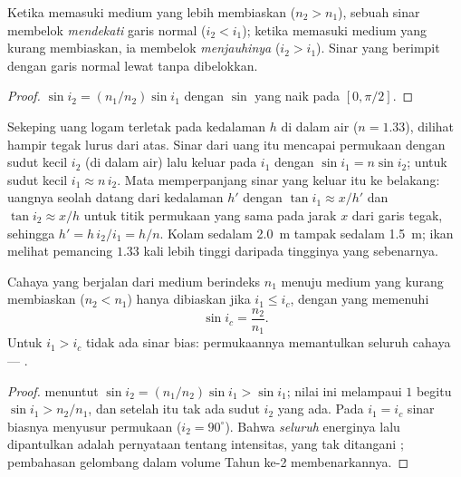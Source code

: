 \begin{proposition}\label{prop:b1:rays-reflection-refraction:bending}
Ketika memasuki medium yang lebih membiaskan ($n_2 > n_1$), sebuah sinar
membelok \emph{mendekati} garis normal ($i_2 < i_1$); ketika memasuki
medium yang kurang membiaskan, ia membelok \emph{menjauhinya}
($i_2 > i_1$). Sinar yang berimpit dengan garis normal lewat tanpa
dibelokkan.
\end{proposition}

\begin{proof}
$\sin i_2 = (n_1/n_2)\sin i_1$ dengan $\sin$ yang naik pada
$[0, \pi/2]$.
\end{proof}

\begin{example}\label{ex:b1:rays-reflection-refraction:depth}
Sekeping uang logam terletak pada kedalaman $h$ di dalam air
($n = 1.33$), dilihat hampir tegak lurus dari atas. Sinar dari uang itu
mencapai permukaan dengan sudut kecil $i_2$ (di dalam air) lalu keluar
pada $i_1$ dengan $\sin i_1 = n\sin i_2$; untuk sudut kecil
$i_1 \approx n\,i_2$. Mata memperpanjang sinar yang keluar itu ke
belakang: uangnya seolah datang dari kedalaman $h'$ dengan
$\tan i_1 \approx x/h'$ dan $\tan i_2 \approx x/h$ untuk titik permukaan
yang sama pada jarak $x$ dari garis tegak, sehingga
$h' = h\,i_2/i_1 = h/n$. Kolam sedalam \qty{2.0}{m} tampak sedalam
\qty{1.5}{m}; ikan melihat pemancing $1.33$ kali lebih tinggi daripada
tingginya yang sebenarnya.
\end{example}

\begin{theorem}\label{thm:b1:rays-reflection-refraction:tir}
Cahaya yang berjalan dari medium berindeks $n_1$ menuju medium yang
kurang membiaskan ($n_2 < n_1$) hanya dibiaskan jika $i_1 \leq i_c$,
dengan \emph{} yang memenuhi
\[
\sin i_c = \frac{n_2}{n_1} .
\]
Untuk $i_1 > i_c$ tidak ada sinar bias: permukaannya memantulkan seluruh
cahaya --- \emph{}.
\end{theorem}

\begin{proof}
 menuntut $\sin i_2 = (n_1/n_2)\sin i_1 > \sin i_1$; nilai ini
melampaui $1$ begitu $\sin i_1 > n_2/n_1$, dan setelah itu tak ada sudut
$i_2$ yang ada. Pada $i_1 = i_c$ sinar biasnya menyusur permukaan
($i_2 = 90^\circ$). Bahwa \emph{seluruh} energinya lalu dipantulkan
adalah pernyataan tentang intensitas, yang tak ditangani ; pembahasan gelombang dalam volume Tahun ke-2 membenarkannya.
\end{proof}

